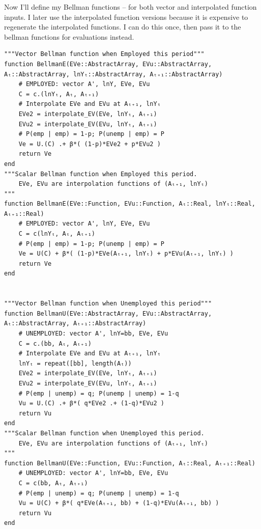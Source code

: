 \documentclass[12pt]{article}
\begin{document}
Now I'll define my Bellman functions -- for both vector and interpolated  function inputs. I later use the interpolated function versions because it is expensive to regenerate the interpolated functions. I can do this once, then pass it to the bellman functions for evaluations instead.

\begin{lstlisting}[language=JuliaLocal, style=julia]
"""Vector Bellman function when Employed this period"""
function BellmanE(EVe::AbstractArray, EVu::AbstractArray, Aₜ::AbstractArray, lnYₜ::AbstractArray, Aₜ₊₁::AbstractArray)
    # EMPLOYED: vector A', lnY, EVe, EVu
    C = c.(lnYₜ, Aₜ, Aₜ₊₁)
    # Interpolate EVe and EVu at Aₜ₊₁, lnYₜ
    EVe2 = interpolate_EV(EVe, lnYₜ, Aₜ₊₁)
    EVu2 = interpolate_EV(EVu, lnYₜ, Aₜ₊₁)
    # P(emp | emp) = 1-p; P(unemp | emp) = P
    Ve = U.(C) .+ β*( (1-p)*EVe2 + p*EVu2 )
    return Ve
end
"""Scalar Bellman function when Employed this period.
    EVe, EVu are interpolation functions of (Aₜ₊₁, lnYₜ)
"""
function BellmanE(EVe::Function, EVu::Function, Aₜ::Real, lnYₜ::Real, Aₜ₊₁::Real)
    # EMPLOYED: vector A', lnY, EVe, EVu
    C = c(lnYₜ, Aₜ, Aₜ₊₁)
    # P(emp | emp) = 1-p; P(unemp | emp) = P
    Ve = U(C) + β*( (1-p)*EVe(Aₜ₊₁, lnYₜ) + p*EVu(Aₜ₊₁, lnYₜ) )
    return Ve
end


"""Vector Bellman function when Unemployed this period"""
function BellmanU(EVe::AbstractArray, EVu::AbstractArray, Aₜ::AbstractArray, Aₜ₊₁::AbstractArray)
    # UNEMPLOYED: vector A', lnY=bb, EVe, EVu
    C = c.(bb, Aₜ, Aₜ₊₁)
    # Interpolate EVe and EVu at Aₜ₊₁, lnYₜ
    lnYₜ = repeat([bb], length(Aₜ))
    EVe2 = interpolate_EV(EVe, lnYₜ, Aₜ₊₁)
    EVu2 = interpolate_EV(EVu, lnYₜ, Aₜ₊₁)
    # P(emp | unemp) = q; P(unemp | unemp) = 1-q
    Vu = U.(C) .+ β*( q*EVe2 .+ (1-q)*EVu2 )
    return Vu
end
"""Scalar Bellman function when Unemployed this period.
    EVe, EVu are interpolation functions of (Aₜ₊₁, lnYₜ)
"""
function BellmanU(EVe::Function, EVu::Function, Aₜ::Real, Aₜ₊₁::Real)
    # UNEMPLOYED: vector A', lnY=bb, EVe, EVu
    C = c(bb, Aₜ, Aₜ₊₁)
    # P(emp | unemp) = q; P(unemp | unemp) = 1-q
    Vu = U(C) + β*( q*EVe(Aₜ₊₁, bb) + (1-q)*EVu(Aₜ₊₁, bb) )
    return Vu
end
\end{lstlisting}







\newpage
\end{document}
